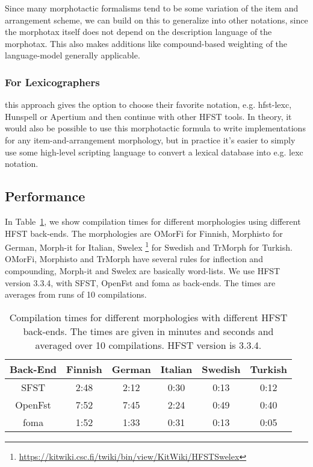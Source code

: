 \documentclass{llncs}
\begin{document}
Since many morphotactic formalisms tend to be some variation of the item and arrangement scheme,
we can build on this to generalize into other notations, since the morphotax itself
does not depend on the description language of the morphotax. 
This also makes additions like compound-based weighting of the language-model 
\cite{linden/2009/fsmnlp} generally applicable.

\subsubsection{For Lexicographers} this approach gives the option to
choose their favorite notation, e.g. hfst-lexc, Hunspell or Apertium and then continue with other
HFST tools. In theory, it would also be possible to use this morphotactic formula
to write implementations for any item-and-arrangement morphology, but in practice
it's easier to simply use some high-level scripting language to convert a lexical database into 
e.g. lexc notation.

\subsection{Performance}

In Table~\ref{tab:compilation_times}, we show compilation times for different 
morphologies using different HFST back-ends. The morphologies are OMorFi 
\cite{pirinen/2008} for Finnish, Morphisto \cite{zielinski/2009} for German,
Morph-it \cite{Zanchetta/2005} for Italian, Swelex 
\footnote{\url{https://kitwiki.csc.fi/twiki/bin/view/KitWiki/HFSTSwelex}} 
for Swedish and TrMorph \cite{Coltekin/2010} for Turkish. 
OMorFi, Morphisto and TrMorph have several rules for
inflection and compounding, Morph-it and Swelex are basically word-lists.
We use HFST version 3.3.4, with SFST, OpenFst and foma as
back-ends. The times are averages from runs of 10 compilations.

\begin{table} [h!]
  \centering
  \caption{Compilation times for different morphologies with
    different HFST back-ends. The times are given in minutes and seconds
    and averaged over 10 compilations. HFST version is 3.3.4.}
  \begin{tabular}{| c | c | c | c | c | c |}
    \hline
    Back-End & Finnish & German & Italian & Swedish & Turkish \\ \hline\hline
    SFST & 2:48 & 2:12 & 0:30 & 0:13 & 0:12 \\ \hline
    OpenFst & 7:52 & 7:45 & 2:24 & 0:49 & 0:40 \\ \hline
    foma & 1:52 & 1:33 & 0:31 & 0:13 & 0:05 \\ \hline
  \end{tabular}
  \label{tab:compilation_times}
\end{table}
\end{document}
